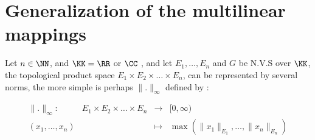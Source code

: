 
% 

\lecday[2025-03-11]

% 

\section{Generalization of the multilinear mappings}
Let $n \in \NN $, and $\KK = \RR  $ or $\CC  $ , 
and let $E_1, \hdots , E_{n} $  and $G $ 
be N.V.S over $\KK $, the topological product
space $E_1 \times  E_2 \times \hdots \times E_{n}    $,
can be represented by several norms, the more simple 
is perhaps  $\| . \| _{\infty } $ defined by :

\[
\begin{array}{cccc}
      \| . \| _{\infty } : &  
			   E_1 \times E_2 \times \hdots 
			   \times E_{n} & \longrightarrow & 
			   [0,\infty )\\
			   (x_1, \hdots ,x_{n}) &    & \longmapsto     &  
			   \max 
			   \left( 
				   \| x_1 \| _{E_1},
				   \hdots , \| x_{n} \| _{E_{n}}
			   \right)\\ 
\end{array}
\]

